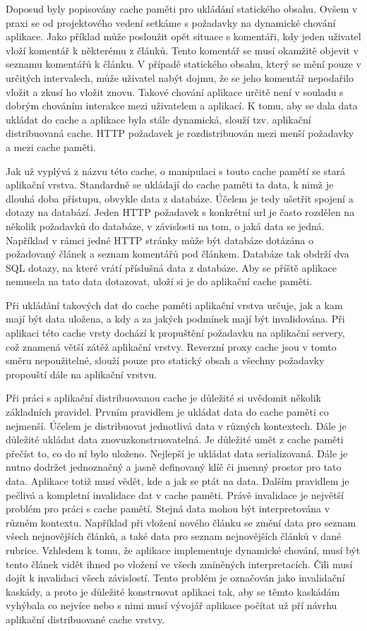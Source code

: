 \documentclass[12pt]{article}
\begin{document}
Doposud byly popisovány cache paměti pro ukládání statického obsahu. Ovšem v praxi se od projektového vedení setkáme s požadavky na dynamické chování aplikace. Jako příklad může posloužit opět situace s komentáři, kdy jeden uživatel vloží komentář k některému z článků. Tento komentář se musí okamžitě objevit v seznamu komentářů k článku. V případě statického obsahu, který se mění pouze v určitých intervalech, může uživatel nabýt dojmu, že se jeho komentář nepodařilo vložit a zkusí ho vložit znovu. Takové chování aplikace určitě není v souladu s dobrým chováním interakce mezi uživatelem a aplikací. K tomu, aby se dala data ukládat do cache a aplikace byla stále dynamická, slouží tzv. aplikační distribuovaná cache. HTTP požadavek je rozdistribuován mezi menší požadavky a mezi cache paměti.

Jak už vyplývá z názvu této cache, o manipulaci s touto cache pamětí se stará aplikační vrstva. Standardně se ukládají do cache paměti ta data, k nimž je dlouhá doba přístupu, obvykle data z databáze. Účelem je tedy ušetřit spojení a dotazy na databází. Jeden HTTP požadavek s konkrétní url je často rozdělen na několik požadavků do databáze, v závislosti na tom, o jaká data se jedná. Například v rámci jedné HTTP stránky může být databáze dotázána o požadovaný článek a seznam komentářů pod článkem. Databáze tak obdrží dva SQL dotazy, na které vrátí příslušná data z databáze. Aby se příště aplikace nemusela na tato data dotazovat, uloží si je do aplikační cache paměti.

Při ukládání takových dat do cache paměti aplikační vrstva určuje, jak a kam mají být data uložena, a kdy a za jakých podmínek mají být invalidována. Při aplikaci této cache vrsty dochází k propuštění požadavku na aplikační servery, což znamená větší zátěž aplikační vrstvy. Reverzní proxy cache jsou v tomto směru nepoužitelné, slouží pouze pro statický obsah a všechny požadavky propouští dále na aplikační vrstvu.

Při práci s aplikační distribuovanou cache je důležité si uvědomit několik základních pravidel. Prvním pravidlem je ukládat data do cache paměti co nejmenší. Účelem je distribuovat jednotlivá data v různých kontextech. Dále je důležité ukládat data znovuzkonstruovatelná. Je důležité umět z cache paměti přečíst to, co do ní bylo uloženo. Nejlepší je ukládat data serializovaná. Dále je nutno dodržet jednoznačný a jasně definovaný klíč či jmenný prostor pro tato data. Aplikace totiž musí vědět, kde a jak se ptát na data. Dalším pravidlem je pečlivá a kompletní invalidace dat v cache paměti. Právě invalidace je největší problém pro práci s cache pamětí. Stejná data mohou být interpretována v různém kontextu. Například při vložení nového článku se změní data pro seznam všech nejnovějších článků, a také data pro seznam nejnovějších článků v dané rubrice. Vzhledem k tomu, že aplikace implementuje dynamické chování, musí být tento článek vidět ihned po vložení ve všech zmíněných interpretacích. Čili musí dojít k invalidaci všech závislostí. Tento problém je označován jako invalidační kaskády, a proto je důležité konstruovat aplikaci tak, aby se těmto kaskádám vyhýbala co nejvíce nebo s nimi musí vývojář aplikace počítat už pří návrhu aplikační distribuované cache vrstvy.
\end{document}
